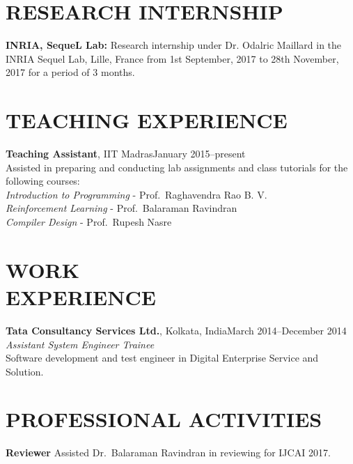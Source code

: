 \documentclass[margin,11pt]{res}
\begin{document}
\begin{resume}
\section{RESEARCH INTERNSHIP}
\textbf{INRIA, SequeL Lab:} Research internship under Dr. Odalric Maillard in the INRIA Sequel Lab, Lille, France from 1st September, 2017 to 28th November, 2017 for a period of 3 months.

\section{TEACHING EXPERIENCE}
\par
\textbf{Teaching Assistant}, IIT Madras\hfill January 2015--present\\
Assisted in preparing and conducting lab assignments and class tutorials for the following courses:\\
\textit{Introduction to Programming} - Prof.~Raghavendra Rao B. V. \\
\textit{Reinforcement Learning} - Prof.~Balaraman Ravindran\\
\textit{Compiler Design} - Prof.~Rupesh Nasre

\section{WORK\\EXPERIENCE}
\textbf{Tata Consultancy Services Ltd.}, Kolkata, India\hfill March 2014--December 2014\\
\textit{Assistant System Engineer Trainee}\\
Software development and test engineer in Digital Enterprise Service and Solution.


\section{PROFESSIONAL ACTIVITIES}
\textbf{Reviewer} 
Assisted Dr.~Balaraman Ravindran in reviewing for IJCAI 2017.\\



\end{resume}
\end{document}
